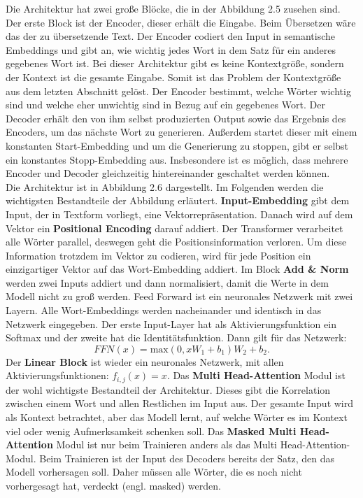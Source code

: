 \documentclass[12pt,letterpaper,ngerman]{article}
\begin{document}
Die Architektur hat zwei große Blöcke, die in der Abbildung 2.5
zusehen sind. Der erste Block ist der Encoder, dieser erhält die
Eingabe. Beim Übersetzen wäre das der zu übersetzende Text.
Der Encoder codiert den Input in semantische Embeddings und gibt
an, wie wichtig jedes Wort in dem Satz für ein anderes gegebenes
Wort ist.
Bei dieser Architektur gibt es keine Kontextgröße, sondern der
Kontext ist die gesamte Eingabe. Somit ist das Problem der 
Kontextgröße aus dem letzten Abschnitt gelöst.
Der Encoder bestimmt, welche Wörter wichtig sind und welche eher 
unwichtig sind in Bezug auf ein gegebenes Wort.
Der Decoder erhält den von ihm selbst produzierten Output sowie 
das Ergebnis des Encoders, um das nächste Wort zu generieren. 
Außerdem startet dieser mit einem konstanten Start-Embedding und 
um die Generierung zu stoppen, gibt er selbst ein konstantes 
Stopp-Embedding aus. Insbesondere ist es möglich, dass mehrere
Encoder und Decoder gleichzeitig hintereinander geschaltet werden 
können.\\
Die Architektur ist in Abbildung 2.6 dargestellt. Im Folgenden 
werden die wichtigsten Bestandteile der Abbildung erläutert.
{\bf Input-Embedding}
gibt dem Input, der in Textform vorliegt, eine Vektorrepräsentation.
Danach wird auf dem Vektor ein {\bf Positional Encoding} darauf
addiert.
Der Transformer verarbeitet alle Wörter parallel, deswegen geht die 
Positionsinformation verloren. Um diese Information trotzdem im 
Vektor 
zu codieren, wird für jede Position ein einzigartiger Vektor auf
das Wort-Embedding addiert. 
Im Block {\bf Add \& Norm} werden zwei Inputs addiert und dann 
normalisiert, damit die Werte in dem Modell nicht zu groß werden.
Feed Forward ist ein neuronales Netzwerk mit zwei Layern.
Alle Wort-Embeddings werden nacheinander und identisch in das
Netzwerk eingegeben. Der erste Input-Layer hat als 
Aktivierungsfunktion ein 
Softmax und der zweite hat die Identitätsfunktion.
Dann gilt für das Netzwerk:
\[
  FFN(x) =\text{max}(0, xW_1 + b_1)W_2 + b_2.
\]
Der {\bf Linear Block} ist wieder ein neuronales Netzwerk, mit allen
Aktivierungsfunktionen: $ f_{i,j}(x) = x $. 
Das {\bf Multi Head-Attention} Modul ist der wohl wichtigste 
Bestandteil der Architektur. Dieses gibt die Korrelation 
zwischen einem Wort und allen
Restlichen im Input aus. Der gesamte Input wird als Kontext 
betrachtet, aber das Modell lernt, auf welche Wörter es im 
Kontext viel oder wenig
Aufmerksamkeit schenken soll. Das {\bf Masked Multi Head-Attention}
Modul ist nur beim Trainieren anders als das Multi 
Head-Attention-Modul.
Beim Trainieren ist der Input des Decoders bereits der Satz,
den das Modell vorhersagen soll. Daher müssen alle Wörter, 
die es noch nicht vorhergesagt hat, verdeckt (engl. masked) werden.
\end{document}
